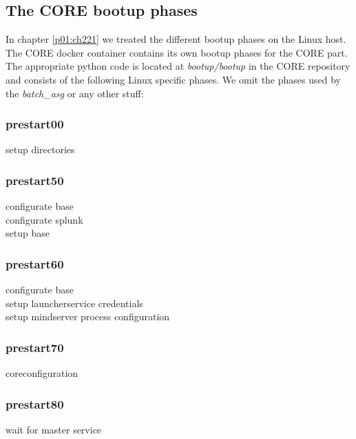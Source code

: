 		\subsection{The CORE bootup phases}
		In chapter \ref{p01:ch221} we treated the different bootup phases on the Linux host. The CORE docker container contains its own bootup phases for the CORE part. The appropriate python code is located at \emph{bootup/bootup} in the CORE repository and consists of the following Linux specific phases. We omit the phases used by the \emph{batch\_asg} or any other stuff:
			
			\subsubsection{prestart00}
			\begin{description}
				\item[setup directories]
			\end{description}
			\subsubsection{prestart50}
			\begin{description}
				\item[configurate base]
				\item[configurate splunk]
				\item[setup base]
			\end{description}
			\subsubsection{prestart60}
			\begin{description}
				\item[configurate base]
				\item[setup launcherservice credentials]
				\item[setup mindserver process configuration]
			\end{description}
			\subsubsection{prestart70}
			\begin{description}
				\item[coreconfiguration]
			\end{description}
			\subsubsection{prestart80}
			\begin{description}
				\item[wait for master service]
			\end{description}
